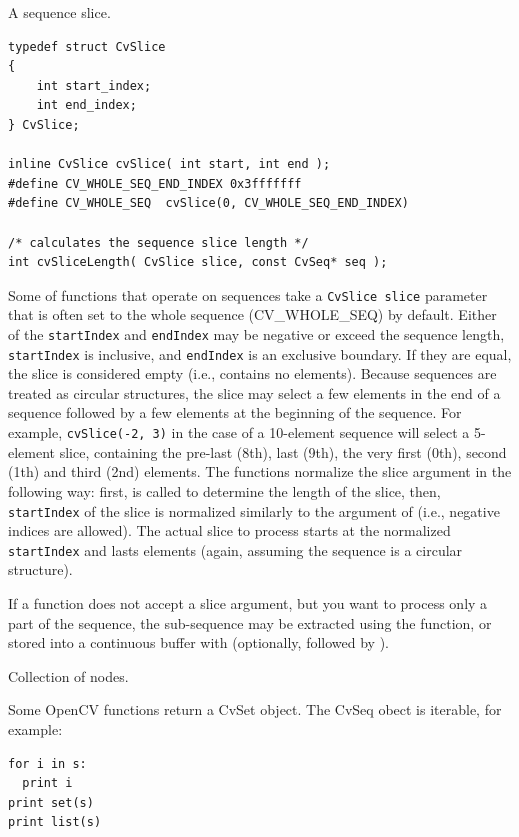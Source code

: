 \label{CvSlice}
A sequence slice.

\begin{lstlisting}
typedef struct CvSlice
{
    int start_index;
    int end_index;
} CvSlice;

inline CvSlice cvSlice( int start, int end );
#define CV_WHOLE_SEQ_END_INDEX 0x3fffffff
#define CV_WHOLE_SEQ  cvSlice(0, CV_WHOLE_SEQ_END_INDEX)

/* calculates the sequence slice length */
int cvSliceLength( CvSlice slice, const CvSeq* seq );
\end{lstlisting}

Some of functions that operate on sequences take a \texttt{CvSlice slice}
parameter that is often set to the whole sequence (CV\_WHOLE\_SEQ) by
default. Either of the \texttt{startIndex} and \texttt{endIndex}
may be negative or exceed the sequence length, \texttt{startIndex} is
inclusive, and \texttt{endIndex} is an exclusive boundary. If they are equal,
the slice is considered empty (i.e., contains no elements). Because
sequences are treated as circular structures, the slice may select a
few elements in the end of a sequence followed by a few elements at the
beginning of the sequence. For example, \texttt{cvSlice(-2, 3)} in the case of
a 10-element sequence will select a 5-element slice, containing the pre-last
(8th), last (9th), the very first (0th), second (1th) and third (2nd)
elements. The functions normalize the slice argument in the following way:
first,  is called to determine the length of the slice,
then, \texttt{startIndex} of the slice is normalized similarly to the
argument of  (i.e., negative indices are allowed). The
actual slice to process starts at the normalized \texttt{startIndex}
and lasts  elements (again, assuming the sequence is
a circular structure).

If a function does not accept a slice argument, but you want to process
only a part of the sequence, the sub-sequence may be extracted
using the  function, or stored into a continuous
buffer with  (optionally, followed by
).

\fi

\label{CvSet}
Collection of nodes.

\ifPy
Some OpenCV functions return a CvSet object. The CvSeq obect is iterable, for example:

\begin{lstlisting}
for i in s:
  print i
print set(s)
print list(s)
\end{lstlisting}

